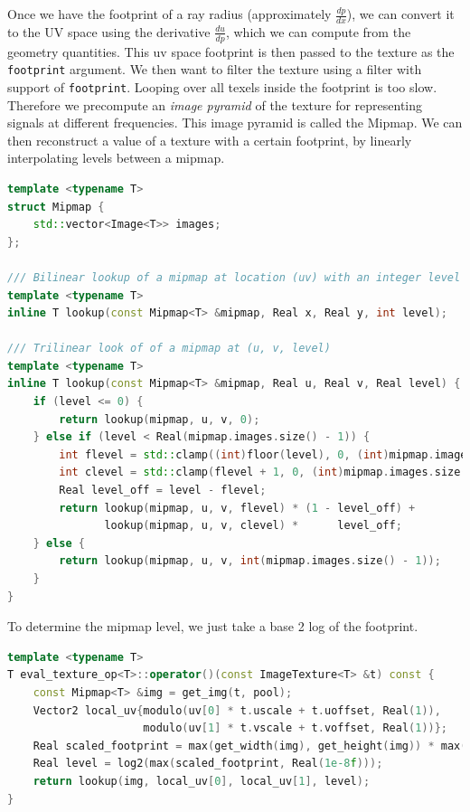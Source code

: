 \documentclass{article}
\begin{document}
Once we have the footprint of a ray radius (approximately $\frac{dp}{dx}$), we can convert it to the UV space using the derivative $\frac{du}{dp}$, which we can compute from the geometry quantities. This uv space footprint is then passed to the texture as the \lstinline{footprint} argument. We then want to filter the texture using a filter with support of \lstinline{footprint}. Looping over all texels inside the footprint is too slow. Therefore we precompute an \emph{image pyramid} of the texture for representing signals at different frequencies. This image pyramid is called the Mipmap. We can then reconstruct a value of a texture with a certain footprint, by linearly interpolating levels between a mipmap.

\begin{lstlisting}[language=c++]
template <typename T>
struct Mipmap {
    std::vector<Image<T>> images;
};

/// Bilinear lookup of a mipmap at location (uv) with an integer level
template <typename T>
inline T lookup(const Mipmap<T> &mipmap, Real x, Real y, int level);

/// Trilinear look of of a mipmap at (u, v, level)
template <typename T>
inline T lookup(const Mipmap<T> &mipmap, Real u, Real v, Real level) {
    if (level <= 0) {
        return lookup(mipmap, u, v, 0);
    } else if (level < Real(mipmap.images.size() - 1)) {
        int flevel = std::clamp((int)floor(level), 0, (int)mipmap.images.size() - 1);
        int clevel = std::clamp(flevel + 1, 0, (int)mipmap.images.size() - 1);
        Real level_off = level - flevel;
        return lookup(mipmap, u, v, flevel) * (1 - level_off) +
               lookup(mipmap, u, v, clevel) *      level_off;
    } else {
        return lookup(mipmap, u, v, int(mipmap.images.size() - 1));
    }
}
\end{lstlisting}

To determine the mipmap level, we just take a base 2 log of the footprint.
\begin{lstlisting}[language=c++]
template <typename T>
T eval_texture_op<T>::operator()(const ImageTexture<T> &t) const {
    const Mipmap<T> &img = get_img(t, pool);
    Vector2 local_uv{modulo(uv[0] * t.uscale + t.uoffset, Real(1)),
                     modulo(uv[1] * t.vscale + t.voffset, Real(1))};
    Real scaled_footprint = max(get_width(img), get_height(img)) * max(t.uscale, t.vscale) * footprint;
    Real level = log2(max(scaled_footprint, Real(1e-8f)));
    return lookup(img, local_uv[0], local_uv[1], level);
}
\end{lstlisting}
\end{document}
